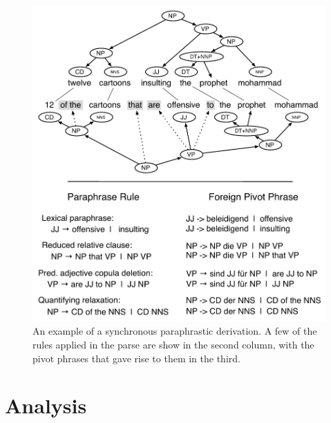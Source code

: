 \documentclass[11pt]{article}
\begin{document}
\begin{figure}[!t]
\begin{center}
\includegraphics[width=0.99\linewidth]{figures/example_compression_1col.pdf}
\end{center}
\caption{An example of a synchronous paraphrastic derivation. A few of
  the rules applied in the parse are show in the second column, with
  the pivot phrases that gave rise to them in the third.}\label{paraphrase_derivaton}
\end{figure}

\section{Analysis} \label{analysis}
\end{document}
